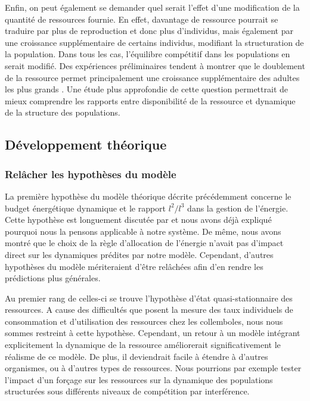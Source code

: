 Enfin, on peut également se demander quel serait l'effet d'une modification de
la quantité de ressources fournie. En effet, davantage de ressource pourrait
se traduire par plus de reproduction et donc plus d'individus, mais également
par une croissance supplémentaire de certains individus, modifiant la
structuration de la population. Dans tous les cas, l'équilibre compétitif
dans les populations en serait modifié. Des expériences préliminaires tendent à
montrer que le doublement de la ressource permet principalement une croissance
supplémentaire des adultes les plus grands \autocites{mallard2013b}. Une étude
plus approfondie de cette question permettrait de mieux comprendre les rapports
entre disponibilité de la ressource et dynamique de la structure des
populations.
%

\subsection{Développement théorique}

\subsubsection{Relâcher les hypothèses du modèle}

La première hypothèse du modèle théorique décrite précédemment concerne le
budget énergétique dynamique et le rapport $l^2 / l^3$ dans la gestion de
l'énergie. Cette hypothèse est longuement discutée par \textcites{kooijman2000a}
et nous avons déjà expliqué pourquoi nous la pensons applicable à notre système.
De même, nous avons montré que le choix de la règle d'allocation de l'énergie
n'avait pas d'impact direct sur les dynamiques prédites par notre modèle.
Cependant, d'autres hypothèses du modèle mériteraient d'être relâchées afin d'en
rendre les prédictions plus générales.

Au premier rang de celles-ci se trouve l'hypothèse d'état quasi-stationnaire des
ressources. A cause des difficultés que posent la mesure des taux individuels de
consommation et d'utilisation des ressources chez les collemboles, nous nous
sommes restreint à cette hypothèse. Cependant, un retour à un modèle intégrant
explicitement la dynamique de la ressource améliorerait significativement le
réalisme de ce modèle. De plus, il deviendrait facile à
étendre à d'autres organismes, ou à d'autres types de ressources. Nous pourrions
par exemple tester l'impact d'un forçage sur les ressources sur la dynamique des
populations structurées sous différents niveaux de compétition par interférence.

